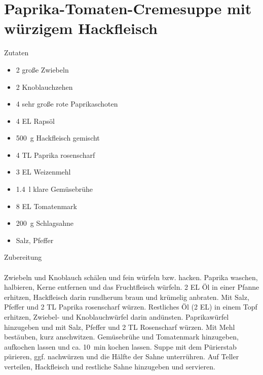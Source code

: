 \section*{Paprika-Tomaten-Cremesuppe mit würzigem Hackfleisch}
\ihead{}\ohead{}
\cfoot{}
{\Large Zutaten}
\begin{multicols}{2}
\begin{itemize}
    \item \num{2} große Zwiebeln
    \item \num{2} Knoblauchzehen
    \item \num{4} sehr große rote Paprikaschoten
    \item \num{4} EL Rapsöl
    \item \SI{500}{g} Hackfleisch gemischt 
    \item \num{4} TL Paprika rosenscharf
    \item \num{3} EL Weizenmehl
    \item \SI{1.4}{l} klare Gemüsebrühe
    \item \num{8} EL Tomatenmark
    \item \SI{200}{g} Schlagsahne
    \item Salz, Pfeffer
\end{itemize}
\end{multicols}
\noindent
{\Large Zubereitung}\\
\\
Zwiebeln und Knoblauch schälen und fein würfeln bzw. hacken.
Paprika waschen, halbieren, Kerne entfernen und das Fruchtfleisch würfeln.
\num{2} EL Öl in einer Pfanne erhitzen, Hackfleisch darin rundherum braun und krümelig anbraten.
Mit Salz, Pfeffer und \num{2} TL Paprika rosenscharf würzen.
Restliches Öl (\num{2} EL) in einem Topf erhitzen, Zwiebel- und Knoblauchwürfel darin andünsten. 
Paprikawürfel hinzugeben und mit Salz, Pfeffer und \num{2} TL Rosenscharf würzen.
Mit Mehl bestäuben, kurz anschwitzen.
Gemüsebrühe und Tomatenmark hinzugeben, aufkochen lassen und ca. \SI{10}{min} kochen lassen.
Suppe mit dem Pürierstab pürieren, ggf. nachwürzen und die Hälfte der Sahne unterrühren.
Auf Teller verteilen, Hackfleisch und restliche Sahne hinzugeben und servieren.
